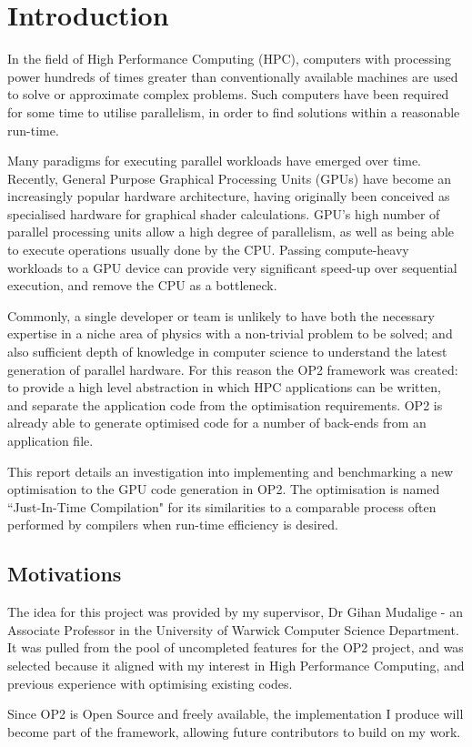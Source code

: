 
\section{Introduction}

In the field of High Performance Computing (HPC), computers with processing power hundreds of times greater than conventionally available machines are used to solve or approximate complex problems. Such computers have been required for some time to utilise parallelism, in order to find solutions within a reasonable run-time.
\par Many paradigms for executing parallel workloads have emerged over time. Recently, General Purpose Graphical Processing Units (GPUs) have become an increasingly popular hardware architecture, having originally been conceived as specialised hardware for graphical shader calculations. GPU's high number of parallel processing units allow a high degree of parallelism, as well as being able to execute operations usually done by the CPU. Passing compute-heavy workloads to a GPU device can provide very significant speed-up over sequential execution, and remove the CPU as a bottleneck.
\par
Commonly, a single developer or team is unlikely to have both the necessary expertise in a niche area of physics with a non-trivial problem to be solved; and also sufficient depth of knowledge in computer science to understand the latest generation of parallel hardware. For this reason the OP2 framework was created: to provide a high level abstraction in which HPC applications can be written, and separate the application code from the optimisation requirements. OP2 is already able to generate optimised code for a number of back-ends from an application file.
\par
This report details an investigation into implementing and benchmarking a new optimisation to the GPU code generation in OP2. The optimisation is named ``Just-In-Time Compilation" for its similarities to a comparable process often performed by compilers when run-time efficiency is desired.
\vfill
\subsection{Motivations}
The idea for this project was provided by my supervisor, Dr Gihan Mudalige - an Associate Professor in the University of Warwick Computer Science Department. It was pulled from the pool of uncompleted features for the OP2 project, and was selected because it aligned with my interest in High Performance Computing, and previous experience with optimising existing codes.
\par
Since OP2 is Open Source and freely available, the implementation I produce will become part of the framework, allowing future contributors to build on my work.


